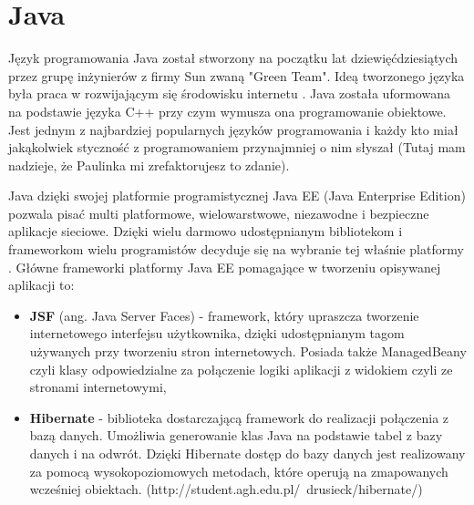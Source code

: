 \section{Java}
\label{sec:java}

Język programowania Java został stworzony na początku lat dziewięćdziesiątych przez grupę inżynierów z firmy Sun zwaną "Green Team". Ideą tworzonego języka była praca w rozwijającym się środowisku internetu \cite{Java01}. Java została uformowana na podstawie języka C++ przy czym wymusza ona programowanie obiektowe. Jest jednym z najbardziej popularnych języków programowania i każdy kto miał jakąkolwiek styczność z programowaniem przynajmniej o nim słyszał (Tutaj mam nadzieje, że Paulinka mi zrefaktorujesz to zdanie). 

Java dzięki swojej platformie programistycznej Java EE (Java Enterprise Edition) pozwala pisać multi platformowe, wielowarstwowe, niezawodne i bezpieczne aplikacje sieciowe. Dzięki wielu darmowo udostępnianym bibliotekom i frameworkom wielu programistów decyduje się na wybranie tej właśnie platformy \cite{JEE01}. Główne frameworki platformy Java EE pomagające w tworzeniu opisywanej aplikacji to:
\begin{itemize}
	\item \textbf{JSF} (ang. Java Server Faces) - framework, który upraszcza tworzenie internetowego interfejsu użytkownika, dzięki udostępnianym tagom używanych przy tworzeniu stron internetowych. Posiada także ManagedBeany czyli klasy odpowiedzialne za połączenie logiki aplikacji z widokiem czyli ze stronami internetowymi,
	\item \textbf{Hibernate} - biblioteka dostarczającą framework do realizacji połączenia z bazą danych. Umożliwia generowanie klas Java na podstawie tabel z bazy danych i na odwrót. Dzięki Hibernate dostęp do bazy danych jest realizowany za pomocą wysokopoziomowych metodach, które operują na zmapowanych wcześniej obiektach. (http://student.agh.edu.pl/~drusieck/hibernate/)
\end{itemize}


